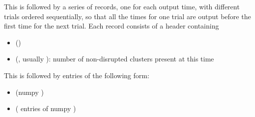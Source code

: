 \documentclass[letterpaper,10pt,english]{sphinxmanual}
\begin{document}
This is followed by a series of records, one for each output time,
with different trials ordered sequentially, so that all the times for
one trial are output before the first time for the next trial. Each
record consists of a header containing
\begin{itemize}
\item {} 
 ()

\item {} 
 (, usually ): number of non-disrupted clusters present at this time

\end{itemize}

This is followed by  entries of the following form:
\begin{itemize}
\item {} 
 (numpy )

\item {} 
 ( entries of numpy )

\end{itemize}
\end{document}
